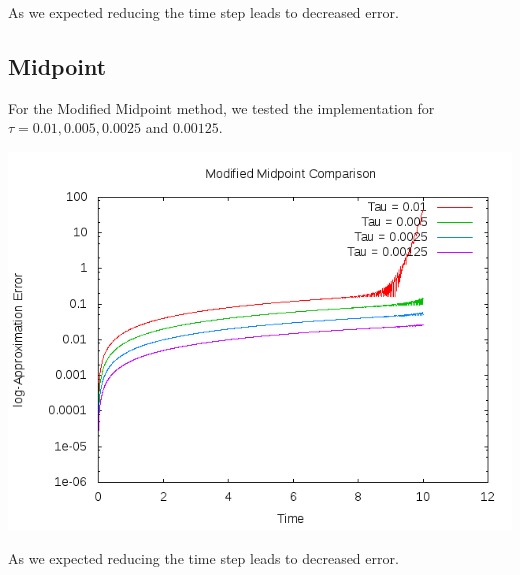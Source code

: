 \documentclass[letterpaper,12pt]{article}
\begin{document}
As we expected reducing the time step leads to decreased error.


\subsection{Midpoint}

For the Modified Midpoint method, we tested the implementation for $\tau = 0.01, 0.005, 0.0025$ and $0.00125$.

\centerline{\includegraphics[scale = 0.75]{MM.png}}

As we expected reducing the time step leads to decreased error.
\end{document}
